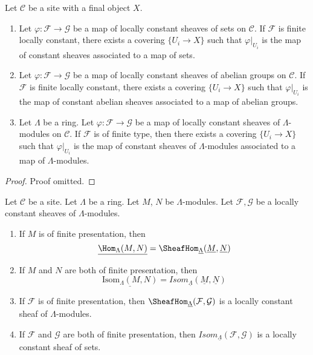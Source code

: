 \begin{lemma}
\label{lemma-morphism-locally-constant}
Let $\mathcal{C}$ be a site with a final object $X$.
\begin{enumerate}
\item Let $\varphi : \mathcal{F} \to \mathcal{G}$ be a map
of locally constant sheaves of sets on $\mathcal{C}$.
If $\mathcal{F}$ is finite locally constant, there exists a
covering $\{U_i \to X\}$ such that
$\varphi|_{U_i}$ is the map of constant sheaves associated to
a map of sets.
\item Let $\varphi : \mathcal{F} \to \mathcal{G}$ be a map
of locally constant sheaves of abelian groups on $\mathcal{C}$.
If $\mathcal{F}$ is finite locally constant, there exists a
covering $\{U_i \to X\}$ such that $\varphi|_{U_i}$ is the map of
constant abelian sheaves associated to a map of abelian groups.
\item Let $\Lambda$ be a ring.
Let $\varphi : \mathcal{F} \to \mathcal{G}$ be a map
of locally constant sheaves of $\Lambda$-modules on $\mathcal{C}$.
If $\mathcal{F}$ is of finite type, then there exists a covering
$\{U_i \to X\}$ such that $\varphi|_{U_i}$ is the map of constant
sheaves of $\Lambda$-modules associated to a map of $\Lambda$-modules.
\end{enumerate}
\end{lemma}

\begin{proof}
Proof omitted.
\end{proof}

\begin{lemma}
\label{lemma-locally-constant}
Let $\mathcal{C}$ be a site. Let $\Lambda$ be a ring.
Let $M$, $N$ be $\Lambda$-modules.
Let $\mathcal{F}, \mathcal{G}$ be a locally constant sheaves of
$\Lambda$-modules.
\begin{enumerate}
\item If $M$ is of finite presentation, then
$$
\underline{\Hom_\Lambda(M, N)} =
\SheafHom_{\underline{\Lambda}}(\underline{M}, \underline{N})
$$
\item If $M$ and $N$ are both of finite presentation, then
$$
\underline{\text{Isom}_\Lambda(M, N)} =
\mathit{Isom}_{\underline{\Lambda}}(\underline{M}, \underline{N})
$$
\item If $\mathcal{F}$ is of finite presentation, then
$\SheafHom_{\underline{\Lambda}}(\mathcal{F}, \mathcal{G})$
is a locally constant sheaf of $\Lambda$-modules.
\item If $\mathcal{F}$ and $\mathcal{G}$ are both of finite presentation, then
$\mathit{Isom}_{\underline{\Lambda}}(\mathcal{F}, \mathcal{G})$
is a locally constant sheaf of sets.
\end{enumerate}
\end{lemma}

